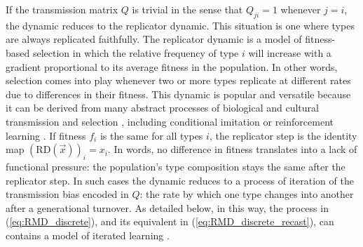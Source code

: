\documentclass[a4paper, 11pt]{article}
\theoremstyle{Satz}
\begin{document}
If the transmission matrix $Q$ is trivial in the sense that $Q_{ji}=1$ whenever $j=i$, the
dynamic reduces to the replicator dynamic. This situation is one where types are always replicated faithfully. The replicator dynamic is a model of fitness-based selection in which the relative frequency of type $i$ will increase with a gradient proportional to its average fitness in the population. In other words, selection comes into play whenever two or more types replicate at different rates due to differences in their fitness. This dynamic is popular and versatile because it can be derived from many abstract processes of biological and cultural
transmission and selection \citep[for overview and several derivations
see][]{Sandholm2010:Population-Game}, including conditional imitation
\citep[e.g.,][]{Helbing1996:A-Stochastic-Be,Schlag1998:Why-Imitate-and} or reinforcement
learning \citep[e.g.,][]{BorgersSarin997:Learning-Throug,Beggs2005:On-the-Converge}. If fitness
$f_i$ is the same for all types $i$, the replicator step is the identity map
$ \left ( \text{RD}(\vec{x}) \right )_i = x_i$. In words, no difference in fitness translates into a lack of functional pressure: the population's type composition stays the same after the replicator step. In such cases the dynamic reduces to a process of iteration of the transmission bias encoded in $Q$: the rate by which one type changes into another after a generational turnover. As detailed below, in this way, the process in (\ref{eq:RMD_discrete}), and its equivalent in (\ref{eq:RMD_discrete_recast}), can contains a model of iterated learning \citep{griffiths+kalish:2005,griffiths+kalish:2007}. 
\end{document}

